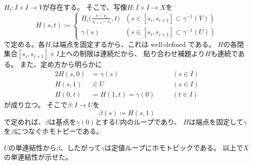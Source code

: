 \documentclass[report]{jlreq}
\begin{document}
\begin{answer}
\begin{innerproof}
        $H_i \colon I \times I \to V$が存在する。
        そこで、写像$H \colon I \times I \to X$を
        \begin{equation}
            H(s, t) \coloneqq \begin{cases}
                H_i \biggl( \frac{s - s_i}{s_{i + 1} - s_i}, t \biggr)
                & (s \in [s_i, s_{i + 1}] \subset \gamma^{-1}(V)) \\
                \gamma(s)
                & (s \in [s_i, s_{i + 1}] \subset \gamma^{-1}(U))
            \end{cases}
        \end{equation}
        で定める。各$H_i$は端点を固定するから、これは well-defined である。
        $H$の各閉集合$[s_i, s_{i + 1}] \times I$上への制限は連続だから、
        貼り合わせ補題より$H$も連続である。
        また、定め方から明らかに
        \begin{alignat}{2}
            H(s, 0) &= \gamma(s) && \quad (s \in I) \\
            H(s, 1) &\in U && \quad (s \in I) \\
            H(0, t) &= H(1, t) = \gamma(0) && \quad (t \in I)
        \end{alignat}
        が成り立つ。
        そこで$\beta \colon I \to U$を
        \begin{equation}
            \beta(s) \coloneqq H(s, 1)
        \end{equation}
        で定めれば、$\beta$は基点を$\gamma(0)$とする$U$内のループであり、
        $H$は端点を固定して$\gamma$を$\beta$につなぐホモトピーである。
    \end{innerproof}
    $U$の単連結性から$\beta$、したがって$\gamma$は定値ループにホモトピックである。
    以上で$X$の単連結性が示せた。
\end{answer}

\end{document}
